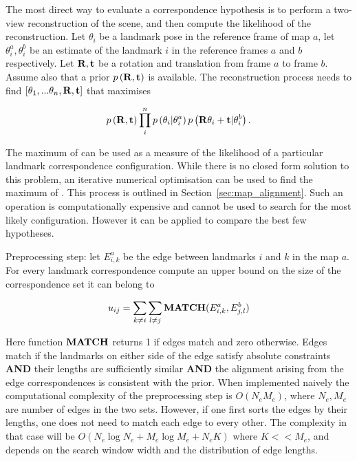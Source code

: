 The most direct way to evaluate a correspondence hypothesis is to
perform a two-view reconstruction of the scene, and then compute the
likelihood of the reconstruction. Let $\theta_i$ be a landmark
pose in the reference frame of map $a$, let $\theta_i^a, \theta_i^b$
be an estimate of the landmark $i$ in the reference frames $a$ and
$b$ respectively. Let ${\bf R},{\bf t}$ be a rotation and translation
from frame $a$ to frame $b$. Assume also that a prior $p\left({\bf
R},{\bf t}\right)$ is available. The reconstruction process needs to
find $\left[\theta_1,...\theta_n, {\bf R},{\bf t}\right]$ that
maximises

\begin{equation}
p\left({\bf R},{\bf t}\right)
\prod_{i}^n p\left(\theta_i | \theta_i^a\right)
p\left({\bf R}\theta_i + {\bf t} | \theta_i^b\right).
\label{eqn:align}
\end{equation}

The maximum of  can be used as a measure of
the likelihood of a particular landmark correspondence configuration.
While there is no closed form solution to this problem, an iterative
numerical optimisation can be used to find the maximum of
. This process is outlined in
Section~\ref{sec:map_alignment}. Such an operation is computationally
expensive and cannot be used to search for the most likely
configuration. However it can be applied to compare the best few
hypotheses.




Preprocessing step: let $E^a_{i,k}$ be the edge between landmarks $i$
and $k$ in the map $a$. For every landmark correspondence compute an
upper bound on the size of the correspondence set it can belong to

$$
u_{ij} = \sum_{k \ne i} \sum_{l \ne j} {\bf MATCH}(E^a_{i,k}, E^b_{j,l})
$$

Here function ${\bf MATCH}$ returns 1 if edges match and zero
otherwise. Edges match if the landmarks on either side of the edge
satisfy absolute constraints {\bf AND} their lengths are sufficiently
similar {\bf AND} the alignment arising from the edge correspondences
is consistent with the prior. When implemented naively the
computational complexity of the preprocessing step is $O(N_eM_e)$,
where $N_e,M_e$ are number of edges in the two sets. However, if one
first sorts the edges by their lengths, one does not need to match
each edge to every other. The complexity in that case will be
$O(N_e\log N_e + M_e\log M_e + N_eK)$ where $K << M_e$, and depends on
the search window width and the distribution of edge lengths.


